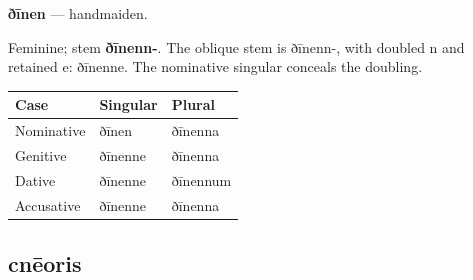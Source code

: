 \par\begin{minipage}{\linewidth}\raggedright
\textbf{ðīnen} — handmaiden.

Feminine; stem \textbf{ðīnenn-}. The oblique stem is ðīnenn-, with doubled n and retained e: ðīnenne. The nominative singular conceals the doubling.

\par\begingroup
\fontsize{10.5}{13.2}\selectfont
\setlength{\LTleft}{0pt}\setlength{\LTright}{\fill}
\noindent
\begin{tabular}{@{}>{\raggedright\arraybackslash}p{39.46mm}>{\raggedright\arraybackslash}p{39.46mm}>{\raggedright\arraybackslash}p{39.46mm}@{}}
\toprule
\textbf{Case} & \textbf{Singular} & \textbf{Plural} \\
\midrule
Nominative & ðīnen & ðīnenna \\
Genitive & ðīnenne & ðīnenna \\
Dative & ðīnenne & ðīnennum \\
Accusative & ðīnenne & ðīnenna \\
\bottomrule
\end{tabular}
\par\endgroup

\end{minipage}\par
{}
\subsection*{cnēoris}

